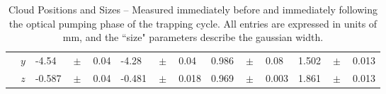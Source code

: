 \begin{table}[h!!!!t]
\begin{center}
\begin{tabular}{ c | r || lcl | lcl || lcl | lcl |}
								& $y$ & -4.54      & \!\!$\!\! \pm  \!\!$\!\! & 0.04   & -4.28    & \!\!$\!\! \pm  \!\!$\!\! & 0.04   & 0.986 & \!\!$\!\! \pm  \!\!$\!\! & 0.08   & 1.502 & \!\!$\!\! \pm  \!\!$\!\! & 0.013 \\
								& $z$ & -0.587    & \!\!$\!\! \pm  \!\!$\!\! & 0.04   & -0.481  & \!\!$\!\! \pm  \!\!$\!\! & 0.018 & 0.969 & \!\!$\!\! \pm  \!\!$\!\! & 0.003 & 1.861 & \!\!$\!\! \pm  \!\!$\!\! & 0.013 \\
			\cline{2-14}
	\end{tabular}
	\label{table:cloudpositions}
	\end{center}
	\caption[Cloud Position and Size]{Cloud Positions and Sizes -- Measured immediately before and immediately following the optical pumping phase of the trapping cycle.  All entries are expressed in units of mm, and the ``size" parameters describe the gaussian width.}
\end{table}


